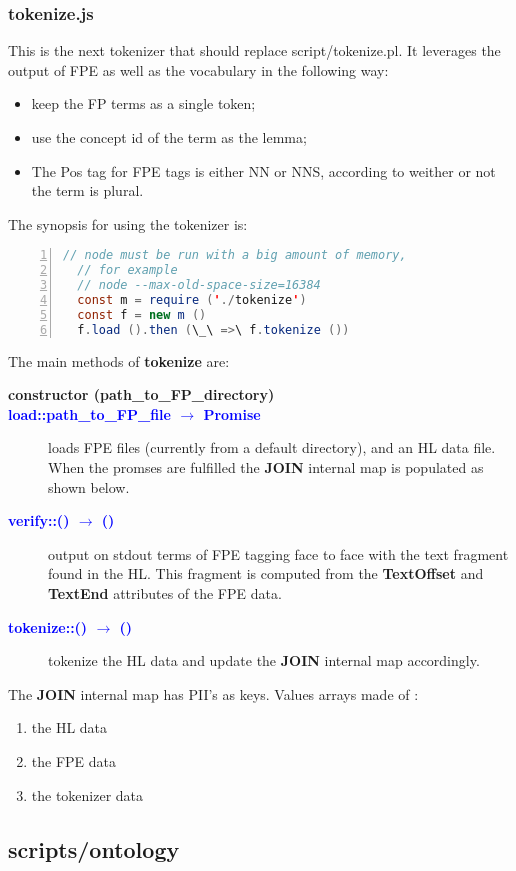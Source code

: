 \documentclass[a4paper,11pt]{report}
\newcommand{\cs}[1]{{\bfseries \ttfamily #1}}
\newcommand{\arrow}[2]{#1 $\rightarrow$ #2}
\newcommand{\fsig}[3]{\textcolor{blue}{\cs{#1::\arrow{#2}{#3}}}}
\newcommand{\sigit}[3]{\item[\fsig{#1}{#2}{#3}]}
\begin{document}
\subsubsection{tokenize.js}
This is the next tokenizer that should replace script/tokenize.pl. It leverages the output of FPE as well as the vocabulary in the following way:
\begin{itemize}
\item keep the FP terms as a single token;
\item use the concept id of the term as the lemma;
\item The Pos tag for FPE tags is either NN or NNS, according to weither or not the term is plural.
\end{itemize}
The synopsis for using the tokenizer is:
\begin{lstlisting}[numbers=left, language=java]
  // node must be run with a big amount of memory,
  // for example
  // node --max-old-space-size=16384
  const m = require ('./tokenize')
  const f = new m ()
  f.load ().then (\_\ =>\ f.tokenize ()) 
\end{lstlisting}
The main methods of \cs{tokenize} are:
%
\begin{description}
  \item[\cs{constructor (path\_to\_FP\_directory)}]
  \sigit{load}{path\_to\_FP\_file}{Promise} loads FPE files (currently from a default directory), and an HL data file. When the promses are fulfilled the \cs{JOIN} internal map is populated as shown below.
  \sigit{verify}{()}{()} output on stdout terms of FPE tagging face to face with the text fragment found in the HL. This fragment is computed from the \cs{TextOffset} and \cs{TextEnd} attributes of the FPE data.
  \sigit{tokenize}{()}{()} tokenize the HL data and update the \cs{JOIN} internal map accordingly.
\end{description}
%
The \cs{JOIN} internal map has PII's as keys. Values arrays made of :
\begin{enumerate}
\item the HL data
\item the FPE data
\item the tokenizer data
\end{enumerate}
%
\subsection{scripts/ontology}
\end{document}
